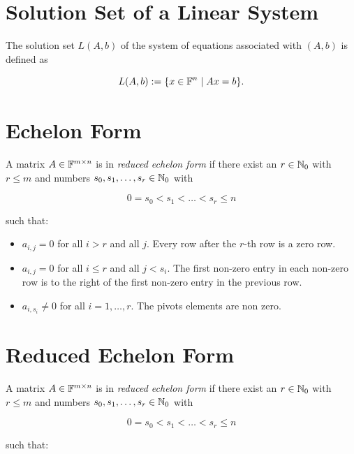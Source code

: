 \section{Solution Set of a Linear System}

The solution set \( L(A, b) \) of the system of equations associated with \( (A, b) \) is defined as

\[
    L(A, b) := \{ x \in \mathbb{F}^n \mid Ax = b \}.
\]

\section{Echelon Form}

A matrix \(A \in \mathbb{F}^{m \times n}\) is in \emph{reduced echelon form} if
there exist an \(r \in \mathbb{N}_0\) with \(r \le m\) and numbers \(s_0, s_1, \dots, s_r \in \mathbb{N}_0\) with

\[
    0 = s_0 < s_1 < \dots < s_r \le n
\]

such that:

\begin{itemize}

    \item \(a_{i,j} = 0\) for all \(i > r\) and all \(j\). Every row after the \(r\)-th row is a zero row.

    \item \(a_{i,j} = 0\) for all \(i \le r\) and all \(j < s_i\). The first non-zero entry in each non-zero row is to the right of the first non-zero entry in the previous row.

    \item \(a_{i,s_i} \neq 0\) for all \(i = 1, \dots, r\). The pivots elements are non zero.

\end{itemize}

\section{Reduced Echelon Form}

A matrix \(A \in \mathbb{F}^{m \times n}\) is in \emph{reduced echelon form} if
there exist an \(r \in \mathbb{N}_0\) with \(r \le m\) and numbers \(s_0, s_1, \dots, s_r \in \mathbb{N}_0\) with

\[
    0 = s_0 < s_1 < \dots < s_r \le n
\]

such that:

